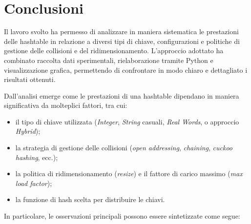 \chapter{Conclusioni}

Il lavoro svolto ha permesso di analizzare in maniera sistematica le prestazioni delle hashtable in relazione a diversi tipi di chiave, 
configurazioni e politiche di gestione delle collisioni e del ridimensionamento.  
L'approccio adottato ha combinato raccolta dati sperimentali, rielaborazione tramite Python e visualizzazione grafica, permettendo di confrontare 
in modo chiaro e dettagliato i risultati ottenuti.

Dall'analisi emerge come le prestazioni di una hashtable dipendano in maniera significativa da molteplici fattori, tra cui:
\begin{itemize}
    \item il tipo di chiave utilizzata (\textit{Integer}, \textit{String} casuali, \textit{Real Words}, o approccio \textit{Hybrid});
    \item la strategia di gestione delle collisioni (\textit{open addressing}, \textit{chaining}, \textit{cuckoo hashing}, ecc.);
    \item la politica di ridimensionamento (\textit{resize}) e il fattore di carico massimo (\textit{max load factor});
    \item la funzione di hash scelta per distribuire le chiavi.
\end{itemize}

In particolare, le osservazioni principali possono essere sintetizzate come segue:

